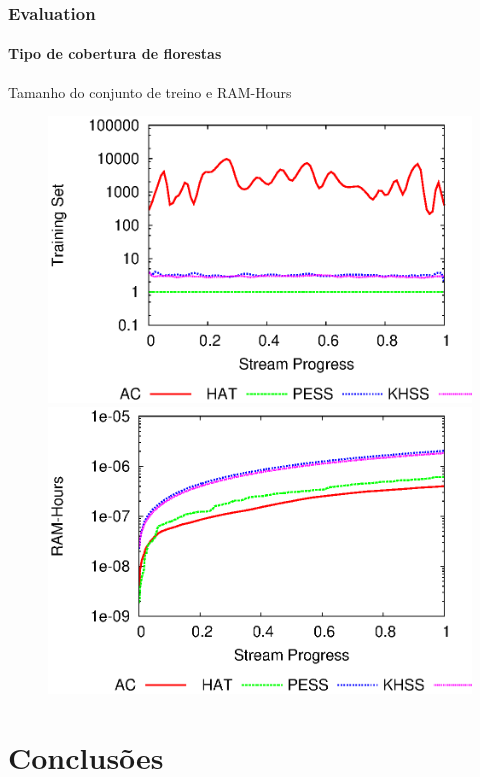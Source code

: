 \documentclass[14pt]{beamer}
\begin{document}
\begin{frame}
\frametitle{Evaluation}
\framesubtitle{Tipo de cobertura de florestas}
Tamanho do conjunto de treino e RAM-Hours
\begin{figure}[htp!]
\centering
\includegraphics[scale=0.41]{covtype_window.eps}
\includegraphics[scale=0.41]{covtype_ramhours.eps}
\end{figure}

\end{frame}

\section{Conclusões}
\end{document}
